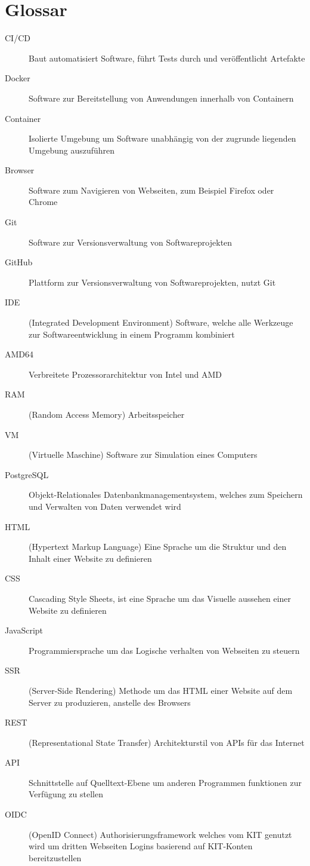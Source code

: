 
\chapter{Glossar}

\begin{description}
\item[CI/CD] Baut automatisiert Software, führt Tests durch und veröffentlicht Artefakte
\item[Docker] Software zur Bereitstellung von Anwendungen innerhalb von Containern
\item[Container] Isolierte Umgebung um Software unabhängig von der zugrunde liegenden Umgebung auszuführen
\item[Browser] Software zum Navigieren von Webseiten, zum Beispiel Firefox oder Chrome
\item[Git] Software zur Versionsverwaltung von Softwareprojekten
\item[GitHub] Plattform zur Versionsverwaltung von Softwareprojekten, nutzt Git
\item[IDE] (Integrated Development Environment) Software, welche alle Werkzeuge zur Softwareentwicklung in einem Programm kombiniert
\item[AMD64] Verbreitete Prozessorarchitektur von Intel und AMD
\item[RAM] (Random Access Memory) Arbeitsspeicher
\item[VM] (Virtuelle Maschine) Software zur Simulation eines Computers
\item[PostgreSQL] Objekt-Relationales Datenbankmanagementsystem, welches zum Speichern und Verwalten von Daten verwendet wird
\item[HTML] (Hypertext Markup Language) Eine Sprache um die Struktur und den Inhalt einer Website zu definieren
\item[CSS] Cascading Style Sheets, ist eine Sprache um das Visuelle aussehen einer Website zu definieren
\item[JavaScript] Programmiersprache um das Logische verhalten von Webseiten zu steuern
\item[SSR] (Server-Side Rendering) Methode um das HTML einer Website auf dem Server zu produzieren, anstelle des Browsers
\item[REST] (Representational State Transfer) Architekturstil von APIs für das Internet
\item[API] Schnittstelle auf Quelltext-Ebene um anderen Programmen funktionen zur Verfügung zu stellen
\item[OIDC] (OpenID Connect) Authorisierungsframework welches vom KIT genutzt wird um dritten Webseiten Logins basierend auf KIT-Konten bereitzustellen
\end{description}